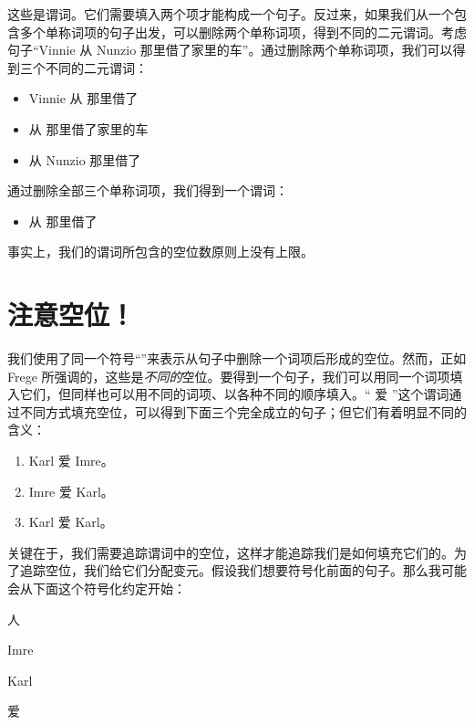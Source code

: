 这些是谓词。它们需要填入两个项才能构成一个句子。反过来，如果我们从一个包含多个单称词项的句子出发，可以删除两个单称词项，得到不同的二元谓词。考虑句子“Vinnie 从 Nunzio 那里借了家里的车”。通过删除两个单称词项，我们可以得到三个不同的二元谓词：

\begin{itemize}
		\item Vinnie 从 \blank{} 那里借了 \blank{}
		\item \blank{} 从 \blank{} 那里借了家里的车
		\item \blank{} 从 Nunzio 那里借了 \blank{}
\end{itemize}

通过删除全部三个单称词项，我们得到一个谓词：

\begin{itemize}
		\item \blank{} 从 \blank{} 那里借了 \blank{}
\end{itemize}

事实上，我们的谓词所包含的空位数原则上没有上限。

\section{注意空位！}

我们使用了同一个符号“\blank”来表示从句子中删除一个词项后形成的空位。然而，正如 \foreignlanguage{german}{Frege} 所强调的，这些是\emph{不同的}空位。要得到一个句子，我们可以用同一个词项填入它们，但同样也可以用不同的词项、以各种不同的顺序填入。“\blank{} 爱 \blank{}”这个谓词通过不同方式填充空位，可以得到下面三个完全成立的句子；但它们有着明显不同的含义：

\begin{enumerate}
	\item\label{terms3} Karl 爱 Imre。
	\item\label{terms3b} Imre 爱 Karl。
	\item\label{terms3a} Karl 爱 Karl。
\end{enumerate}

关键在于，我们需要追踪谓词中的空位，这样才能追踪我们是如何填充它们的。为了追踪空位，我们给它们分配变元。假设我们想要符号化前面的句子。那么我可能会从下面这个符号化约定开始：

\begin{ekey}
		\item[\text{论域}] 人
		\item[i] Imre
		\item[k] Karl
		\item[\atom{L}{x,y}]  爱 
	\end{ekey}

